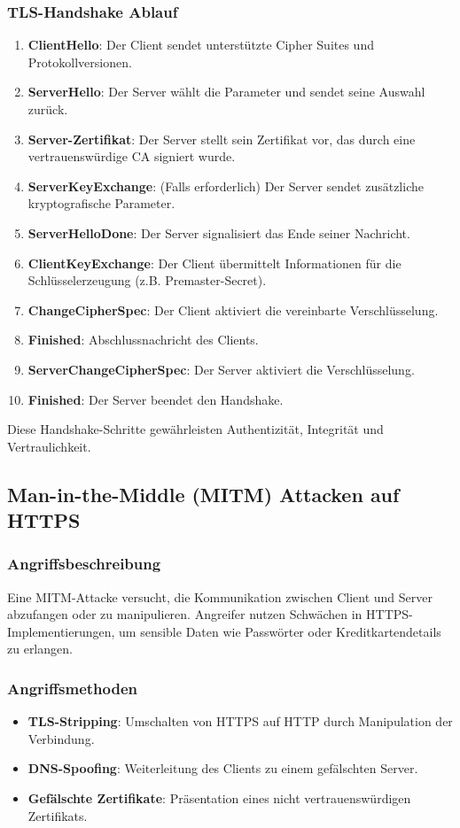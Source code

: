 \documentclass{article}
\begin{document}
\subsubsection{TLS-Handshake Ablauf}
\begin{enumerate}
  \item \textbf{ClientHello}: Der Client sendet unterstützte Cipher Suites und Protokollversionen.
  \item \textbf{ServerHello}: Der Server wählt die Parameter und sendet seine Auswahl zurück.
  \item \textbf{Server-Zertifikat}: Der Server stellt sein Zertifikat vor, das durch eine vertrauenswürdige CA signiert wurde.
  \item \textbf{ServerKeyExchange}: (Falls erforderlich) Der Server sendet zusätzliche kryptografische Parameter.
  \item \textbf{ServerHelloDone}: Der Server signalisiert das Ende seiner Nachricht.
  \item \textbf{ClientKeyExchange}: Der Client übermittelt Informationen für die Schlüsselerzeugung (z.B. Premaster-Secret).
  \item \textbf{ChangeCipherSpec}: Der Client aktiviert die vereinbarte Verschlüsselung.
  \item \textbf{Finished}: Abschlussnachricht des Clients.
  \item \textbf{ServerChangeCipherSpec}: Der Server aktiviert die Verschlüsselung.
  \item \textbf{Finished}: Der Server beendet den Handshake.
\end{enumerate}

Diese Handshake-Schritte gewährleisten Authentizität, Integrität und Vertraulichkeit.

\subsection{Man-in-the-Middle (MITM) Attacken auf HTTPS}

\subsubsection{Angriffsbeschreibung}
Eine MITM-Attacke versucht, die Kommunikation zwischen Client und Server abzufangen oder zu manipulieren. Angreifer nutzen Schwächen in HTTPS-Implementierungen, um sensible Daten wie Passwörter oder Kreditkartendetails zu erlangen.

\subsubsection{Angriffsmethoden}
\begin{itemize}
\item \textbf{TLS-Stripping}: Umschalten von HTTPS auf HTTP durch Manipulation der Verbindung.
\item \textbf{DNS-Spoofing}: Weiterleitung des Clients zu einem gefälschten Server.
\item \textbf{Gefälschte Zertifikate}: Präsentation eines nicht vertrauenswürdigen Zertifikats.
\end{itemize}
\end{document}
